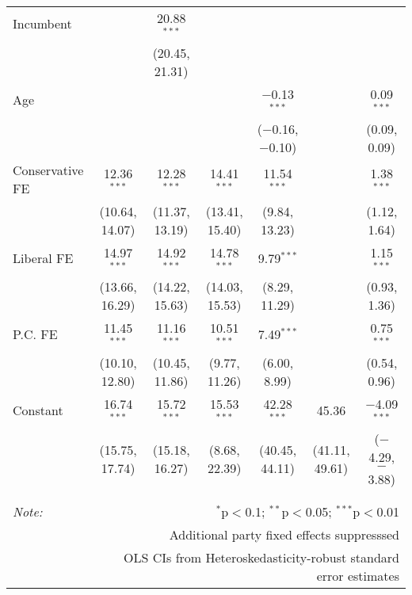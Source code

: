 \begin{table}[!h]
{\begin{tabular}{@{\extracolsep{5pt}}lcccccc}
  Incumbent &  & 20.88$^{***}$ &  &  &  &  \\ 
  &  & (20.45, 21.31) &  &  &  &  \\ 
  Age &  &  &  & $-$0.13$^{***}$ &  & 0.09$^{***}$ \\ 
  &  &  &  & ($-$0.16, $-$0.10) &  & (0.09, 0.09) \\ 
  Conservative FE & 12.36$^{***}$ & 12.28$^{***}$ & 14.41$^{***}$ & 11.54$^{***}$ &  & 1.38$^{***}$ \\ 
  & (10.64, 14.07) & (11.37, 13.19) & (13.41, 15.40) & (9.84, 13.23) &  & (1.12, 1.64) \\ 
  Liberal FE & 14.97$^{***}$ & 14.92$^{***}$ & 14.78$^{***}$ & 9.79$^{***}$ &  & 1.15$^{***}$ \\ 
  & (13.66, 16.29) & (14.22, 15.63) & (14.03, 15.53) & (8.29, 11.29) &  & (0.93, 1.36) \\ 
  P.C. FE & 11.45$^{***}$ & 11.16$^{***}$ & 10.51$^{***}$ & 7.49$^{***}$ &  & 0.75$^{***}$ \\ 
  & (10.10, 12.80) & (10.45, 11.86) & (9.77, 11.26) & (6.00, 8.99) &  & (0.54, 0.96) \\ 
  Constant & 16.74$^{***}$ & 15.72$^{***}$ & 15.53$^{***}$ & 42.28$^{***}$ & 45.36 & $-$4.09$^{***}$ \\ 
  & (15.75, 17.74) & (15.18, 16.27) & (8.68, 22.39) & (40.45, 44.11) & (41.11, 49.61) & ($-$4.29, $-$3.88) \\ 
 \hline \\[-1.8ex] 
\hline 
\hline \\[-1.8ex] 
\textit{Note:}  & \multicolumn{6}{r}{$^{*}$p$<$0.1; $^{**}$p$<$0.05; $^{***}$p$<$0.01} \\ 
 & \multicolumn{6}{r}{Additional party fixed effects suppresssed} \\ 
 & \multicolumn{6}{r}{OLS CIs from Heteroskedasticity-robust standard error estimates} \\ 
\end{tabular}} 
\end{table} 

